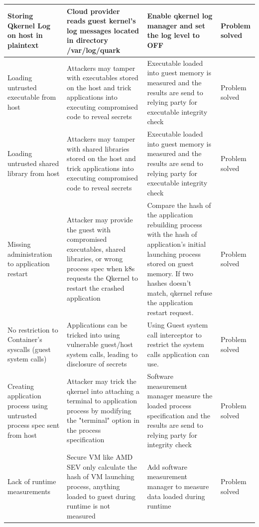 \begin{table}[H]
\begin{tabular}{  p{3.4cm}  p{3.4cm}  p{3.4cm} p{2cm} }
Storing Qkernel Log on host in plaintext
& Cloud provider reads guest kernel’s log messages located in directory /var/log/quark
& Enable qkernel log manager and set the log level to OFF
& Problem solved  \\\hline

Loading untrusted executable from host
& Attackers may tamper with executables stored on the host and trick applications into executing compromised code to reveal secrets
& Executable loaded into guest memory is measured and the results are send to relying party for executable integrity check
& Problem solved  \\\hline

Loading untrusted shared library from host
& Attackers may tamper with shared libraries stored on the host and trick applications into executing compromised code to reveal secrets
& Executable loaded into guest memory is measured and the results are send to relying party for executable integrity check
& Problem solved  \\\hline

Missing administration to application restart
& Attacker may provide the guest with compromised executables, shared libraries, or wrong process spec when k8s requests the Qkernel to restart the crashed application
& Compare the hash of the application rebuilding process with the hash of application's initial launching process stored on guest memory. If two hashes doesn’t match,  qkernel refuse the application restart request.
& Problem solved  \\\hline


No restriction to Container's syscalls (guest system calls)
& Applications can be tricked into using vulnerable guest/host system calls, leading to disclosure of secrets
& Using Guest system call interceptor to restrict the system calls application can use.
& Problem solved  \\\hline


Creating application process using untrusted process spec sent from host
& Attacker may trick the qkernel into attaching a terminal to application process by modifying the "terminal" option in the process specification
& Software measurement manager measure the loaded process specification and the results are send to relying party for integrity check
& Problem solved  \\\hline


Lack of runtime measurements
& Secure VM like AMD SEV only calculate the hash of VM launching process, anything loaded to guest during runtime is not measured
& Add software measurement manager to measure data loaded during runtime
& Problem solved  \\\hline
        \bottomrule
    \end{tabular}
\end{table}



